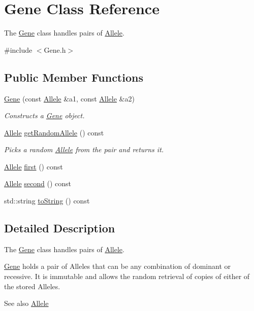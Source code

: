 \hypertarget{class_gene}{}\section{Gene Class Reference}
\label{class_gene}


The \hyperlink{class_gene}{Gene} class handles pairs of \hyperlink{class_allele}{Allele}.  




{\ttfamily \#include $<$Gene.\+h$>$}

\subsection*{Public Member Functions}
\begin{DoxyCompactItemize}
\item 
\hyperlink{class_gene_a0d332f8028c8b2290de114bf026cb514}{Gene} (const \hyperlink{class_allele}{Allele} \&a1, const \hyperlink{class_allele}{Allele} \&a2)
\begin{DoxyCompactList}\small\item\em Constructs a \hyperlink{class_gene}{Gene} object. \end{DoxyCompactList}\item 
\hyperlink{class_allele}{Allele} \hyperlink{class_gene_a7b631b7a53729db7523430049c89e463}{get\+Random\+Allele} () const 
\begin{DoxyCompactList}\small\item\em Picks a random \hyperlink{class_allele}{Allele} from the pair and returns it. \end{DoxyCompactList}\item 
\hyperlink{class_allele}{Allele} \hyperlink{class_gene_a935e5f290b1e66b970ed8b52a97b1ae9}{first} () const 
\item 
\hyperlink{class_allele}{Allele} \hyperlink{class_gene_a7c744b5c6e8d305c47c1563cc0e2acc8}{second} () const 
\item 
std\+::string \hyperlink{class_gene_a3d5569b6329c23acf791ce310735fc5d}{to\+String} () const 
\end{DoxyCompactItemize}


\subsection{Detailed Description}
The \hyperlink{class_gene}{Gene} class handles pairs of \hyperlink{class_allele}{Allele}. 

\hyperlink{class_gene}{Gene} holds a pair of Alleles that can be any combination of dominant or recessive. It is immutable and allows the random retrieval of copies of either of the stored Alleles. \begin{DoxySeeAlso}{See also}
\hyperlink{class_allele}{Allele} 
\end{DoxySeeAlso}


